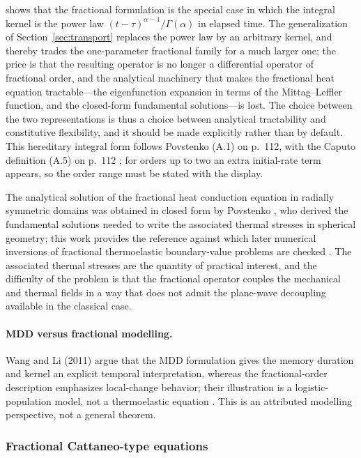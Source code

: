 shows that the fractional formulation is the special case in which the integral kernel is the power law $(t-\tau)^{\alpha-1}/\Gamma(\alpha)$ in elapsed time. The generalization of Section~\ref{sec:transport} replaces the power law by an arbitrary kernel, and thereby trades the one-parameter fractional family for a much larger one; the price is that the resulting operator is no longer a differential operator of fractional order, and the analytical machinery that makes the fractional heat equation tractable---the eigenfunction expansion in terms of the Mittag--Leffler function, and the closed-form fundamental solutions---is lost. The choice between the two representations is thus a choice between analytical tractability and constitutive flexibility, and it should be made explicitly rather than by default. This hereditary integral form follows Povstenko (A.1) on p.~112, with the Caputo definition (A.5) on p.~112 \cite{Povstenko2011} ; for orders up to two an extra initial-rate term appears, so the order range must be stated with the display.

The analytical solution of the fractional heat conduction equation in radially symmetric domains was obtained in closed form by Povstenko \cite{Povstenko2007}, who derived the fundamental solutions needed to write the associated thermal stresses in spherical geometry; this work provides the reference against which later numerical inversions of fractional thermoelastic boundary-value problems are checked \cite{Povstenko2004,Povstenko2009,Povstenko2011,Povstenko2016}. The associated thermal stresses are the quantity of practical interest, and the difficulty of the problem is that the fractional operator couples the mechanical and thermal fields in a way that does not admit the plane-wave decoupling available in the classical case.

\paragraph{MDD versus fractional modelling.} Wang and Li (2011) argue that the MDD formulation gives the memory duration and kernel an explicit temporal interpretation, whereas the fractional-order description emphasizes local-change behavior; their illustration is a logistic-population model, not a thermoelastic equation \cite{Wang2011}. This is an attributed modelling perspective, not a general theorem.

\subsubsection{Fractional Cattaneo-type equations}

